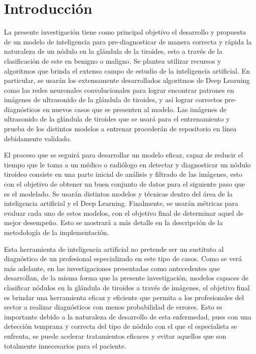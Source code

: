 
\chapter*{Introducción}
La presente investigación tiene como principal objetivo el desarrollo y propuesta de un modelo de inteligencia para pre-diagnosticar de manera correcta y rápida la naturaleza de un nódulo en la glándula de la tiroides, esto a través de la clasificación de este en benigno o maligno. Se plantea utilizar recursos y algoritmos que brinda el extenso campo de estudio de la inteligencia artificial. En particular, se usarán los extensamente desarrollados algoritmos de Deep Learning como las redes neuronales convolucionales para lograr encontrar patrones en imágenes de ultrasonido de la glándula de tiroides, y así lograr correctos pre-diagnósticos en nuevos casos que se presenten al modelo. Las imágenes de ultrasonido de la glándula de tiroides que se usará para el entrenamiento y prueba de los distintos modelos a entrenar procederán de repositorio en línea debidamente validado.	

El proceso que se seguirá para desarrollar un modelo eficaz, capaz de reducir el tiempo que le toma a un médico o radiólogo en detectar y diagnosticar un nódulo tiroideo consiste en una parte inicial de análisis y filtrado de las imágenes, esto con el objetivo de obtener un buen conjunto de datos para el siguiente paso que es el modelado. Se usarán distintos modelos y técnicas dentro del área de la inteligencia artificial y el Deep Learning. Finalmente, se usarán métricas para evaluar cada uno de estos modelos, con el objetivo final de determinar aquel de mejor desempeño. Esto se mostrará a más detalle en la descripción de la metodología de la implementación.

Esta herramienta de inteligencia artificial no pretende ser un sustituto al diagnóstico de un profesional especializado en este tipo de casos. Como se verá más adelante, en las investigaciones presentadas como antecedentes que desarrollan, de la misma forma que la presente investigación, modelos capaces de clasificar nódulos en la glándula de tiroides a través de imágenes, el objetivo final es brindar una herramienta eficaz y eficiente que permita a los profesionales del sector a realizar diagnósticos con menos probabilidad de errores. Esto es importante debido a la naturaleza de desarrollo de esta enfermedad, pues con una detección temprana y correcta del tipo de nódulo con el que el especialista se enfrenta, se puede acelerar tratamientos eficaces y evitar aquellos que son totalmente innecesarios para el paciente.

